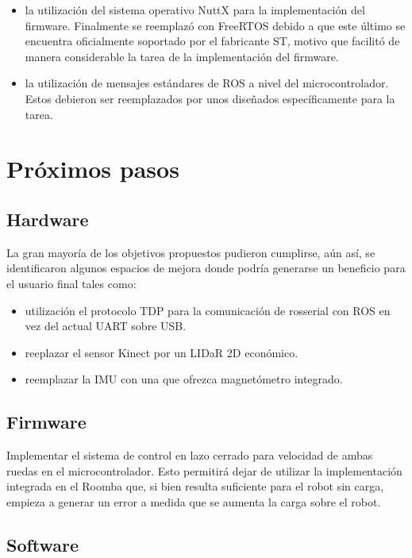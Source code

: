 \begin{itemize}
    \item la utilización del sistema operativo NuttX para la implementación del firmware. Finalmente se reemplazó con FreeRTOS debido a que este último se encuentra oficialmente soportado por el fabricante ST, motivo que facilitó de manera considerable la tarea de la implementación del firmware.
    \item la utilización de mensajes estándares de ROS a nivel del microcontrolador. Estos debieron ser reemplazados por unos diseñados específicamente para la tarea.
\end{itemize}

\section{Próximos pasos}

\subsection{Hardware}

La gran mayoría de los objetivos propuestos pudieron cumplirse, aún así, se identificaron algunos espacios de mejora donde podría generarse un beneficio para el usuario final tales como:

\begin{itemize}
    \item utilización el protocolo TDP para la comunicación de rosserial con ROS en vez del actual UART sobre USB.
    \item reeplazar el sensor Kinect por un LIDaR 2D económico.
    \item reemplazar la IMU con una que ofrezca magnetómetro integrado.
\end{itemize}

\subsection{Firmware}

Implementar el sistema de control en lazo cerrado para velocidad de ambas ruedas en el microcontrolador. Esto permitirá dejar de utilizar la implementación integrada en el Roomba que, si bien resulta suficiente para el robot sin carga, empieza a generar un error a medida que se aumenta la carga sobre el robot.

\subsection{Software}

